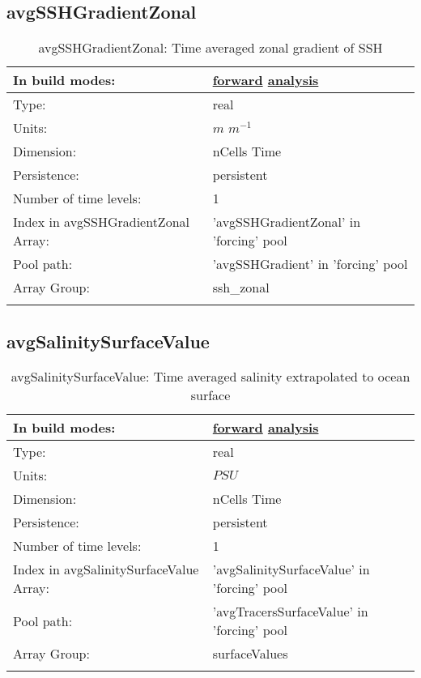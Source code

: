 \subsection[avgSSHGradientZonal]{avgSSHGradientZonal}
\label{subsec:var_sec_forcing_avgSSHGradientZonal}
\begin{center}
\begin{longtable}{| p{2.0in} | p{4.0in} |}
        \hline 
        In build modes: & \hyperref[subsec:forward_var_tab_forcing]{forward} \hyperref[subsec:analysis_var_tab_forcing]{analysis} \\
        \hline 
        Type: & real \\
        \hline 
        Units: & $m$ $m^{-1}$ \\
        \hline 
        Dimension: & nCells Time \\
        \hline 
        Persistence: & persistent \\
        \hline 
        Number of time levels: & 1 \\
        \hline 
		 Index in avgSSHGradientZonal Array: & 'avgSSHGradientZonal' in 'forcing' pool \\
		 \hline 
            Pool path: & 'avgSSHGradient' in 'forcing' pool
 \\
		 \hline 
		 Array Group: & ssh\_zonal \\
		 \hline 
    \caption{avgSSHGradientZonal: Time averaged zonal gradient of SSH}
\end{longtable}
\end{center}
\subsection[avgSalinitySurfaceValue]{avgSalinitySurfaceValue}
\label{subsec:var_sec_forcing_avgSalinitySurfaceValue}
\begin{center}
\begin{longtable}{| p{2.0in} | p{4.0in} |}
        \hline 
        In build modes: & \hyperref[subsec:forward_var_tab_forcing]{forward} \hyperref[subsec:analysis_var_tab_forcing]{analysis} \\
        \hline 
        Type: & real \\
        \hline 
        Units: & $PSU$ \\
        \hline 
        Dimension: & nCells Time \\
        \hline 
        Persistence: & persistent \\
        \hline 
        Number of time levels: & 1 \\
        \hline 
		 Index in avgSalinitySurfaceValue Array: & 'avgSalinitySurfaceValue' in 'forcing' pool \\
		 \hline 
            Pool path: & 'avgTracersSurfaceValue' in 'forcing' pool
 \\
		 \hline 
		 Array Group: & surfaceValues \\
		 \hline 
    \caption{avgSalinitySurfaceValue: Time averaged salinity extrapolated to ocean surface}
\end{longtable}
\end{center}
